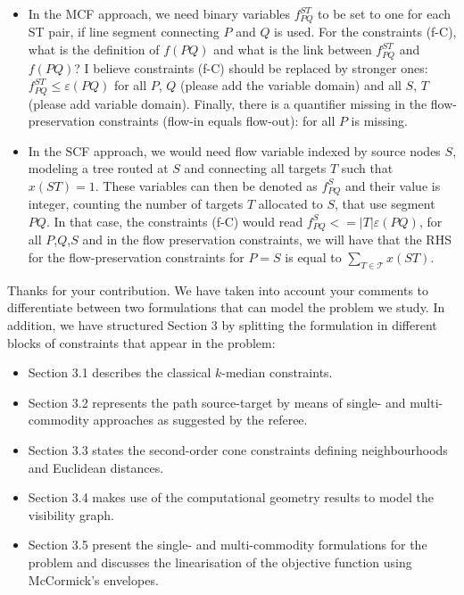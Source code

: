 \documentclass{article}
\newenvironment{reviewer}{\setcounter{pointcounter}{1}}{}
\newcommand{\point}{\text{{\selectfont \thepointcounter} \stepcounter{pointcounter}}}
\begin{document}
\begin{reviewer}
\begin{itshape}
			\begin{itemize}
				\item In the MCF approach, we need binary variables $f^{ST}_{PQ}$ to be set to one for each ST pair, if line segment connecting $P$ and $Q$ is used. For the constraints (f-C), what is the definition of $f(PQ)$ and what is the link between $f^{ST}_{PQ}$ and $f(PQ)$? I believe constraints (f-C) should be replaced by stronger ones: $f^{ST}_{PQ}\leq \varepsilon(PQ)$ for all $P$, $Q$ (please add the variable domain) and all $S$, $T$ (please add variable domain). Finally, there is a quantifier missing in the flow-preservation constraints (flow-in equals flow-out): for all $P$ is missing.
				\item In the SCF approach, we would need flow variable indexed by source nodes $S$, modeling a tree routed at $S$ and connecting all targets $T$ such that $x(ST)=1$. These variables can then be denoted as $f^S_{PQ}$ and their value is integer, counting the number of targets $T$ allocated to $S$, that use segment $PQ$. In that case, the constraints (f-C) would read $f^S_{PQ} <= |T| \varepsilon(PQ)$, for all $P$,$Q$,$S$ and in the flow preservation constraints, we will have that the RHS for the flow-preservation constraints for $P=S$ is equal to $\sum_{T \in \mathcal T} x(ST)$.
			\end{itemize}
		
		\end{itshape}


		\begin{tcolorbox}[breakable,enhanced,coltitle=black,colback=green!5!white,colframe=green!75!black,title=\textbf{Answer R2.\point},borderline={1pt}{0pt}{black},boxrule=0pt]
			Thanks for your contribution. We have taken into account your comments to differentiate between two formulations that can model the problem we study. In addition, we have structured Section 3 by splitting the formulation in different blocks of constraints that appear in the problem:
			\begin{itemize}
				\item Section 3.1 describes the classical $k$-median constraints.
				\item Section 3.2 represents the path source-target by means of single- and multi-commodity approaches as suggested by the referee.
				\item Section 3.3 states the second-order cone constraints defining neighbourhoods and Euclidean distances.
				\item Section 3.4 makes use of the computational geometry results to model the visibility graph.
				\item Section 3.5 present the single- and multi-commodity formulations for the problem and discusses the linearisation of the objective function using McCormick's envelopes.
			\end{itemize}
		\end{tcolorbox}
		

\end{reviewer}
\end{document}
